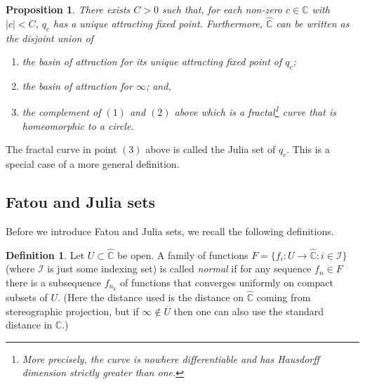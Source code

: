 \documentclass[12pt]{article}
\newtheorem{proposition}[theorem]{Proposition}
\theoremstyle{definition}
\newtheorem{definition}[theorem]{Definition}
\theoremstyle{remark}
\begin{document}
\begin{proposition}
There exists $C >0$ such that, for each non-zero $c \in \mathbb{C}$ with $|c| <C$, $q_c$ has a unique attracting fixed point.
Furthermore, $\widehat{\mathbb{C}}$  can be written as the disjoint union of
\begin{enumerate}
\item[(1)] the basin of attraction for its unique attracting fixed point of $q_c$;
\item[(2)] the basin of attraction for $\infty$; and,
\item[(3)] the complement of $(1)$ and $(2)$ above which is a fractal\footnote{More precisely, the curve is nowhere differentiable and has Hausdorff dimension strictly greater than one.} curve that is homeomorphic to a circle.
\end{enumerate}
\end{proposition}
The fractal curve in point $(3)$ above is called the Julia set of $q_c$. This is a special case of a more general definition.


\subsection{Fatou and Julia sets}
Before we introduce Fatou and Julia sets, we recall the following definitions.
\begin{definition}
Let $U \subset \widehat{\mathbb{C}}$ be open. A family of functions $F = \{f_i: U \to \widehat{\mathbb{C}} : i \in \mathcal{I}\}$ (where $\mathcal I$ is just some indexing set)  is called 
\emph{normal} if for any sequence $f_{n} \in F$ there is a subsequence $f_{n_k}$ of functions that converges uniformly on compact subsets of $U$.
(Here the distance used is the distance on $\widehat{\mathbb{C}}$ coming from stereographic projection, but if
$\infty \notin \overline{U}$ then one can also use the standard distance in $\mathbb C$.)
\end{definition}


\end{document}
